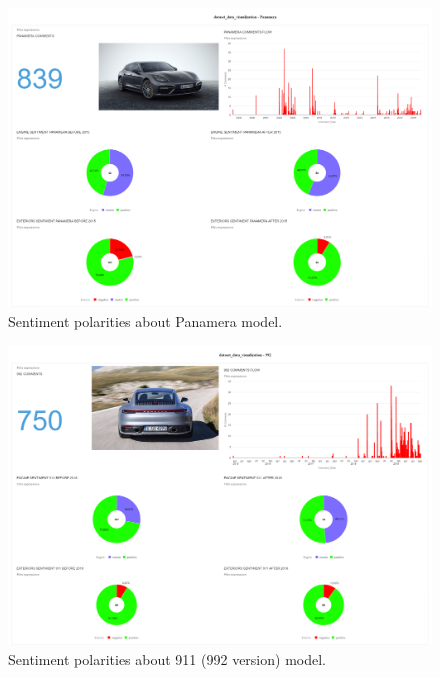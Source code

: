 \begin{figure}[ht]
	\centering
	\includegraphics[width=\textwidth]{figures/odv_export/dataset_data_visualization_2.pdf}
	\caption{Sentiment polarities about Panamera model.}
	\label{fig:panamera-snt}
\end{figure}


\begin{figure}[ht]
	\centering
	\includegraphics[width=\textwidth]{figures/odv_export/dataset_data_visualization_4.pdf}
	\caption{Sentiment polarities about 911 (992 version) model.}
	\label{fig:992-snt}
\end{figure}


